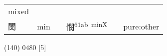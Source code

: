 \documentclass[14pt,a4paper]{scrartcl}
\begin{document}
\begin{longtable}[c]{@{}llllll@{}}
\begin{minipage}[t]{0.14\columnwidth}
mixed
\strut\end{minipage}\tabularnewline
\begin{minipage}[t]{0.14\columnwidth}\raggedright\strut
閔
\strut\end{minipage} &
\begin{minipage}[t]{0.14\columnwidth}\raggedright\strut
min
\strut\end{minipage} &
\begin{minipage}[t]{0.14\columnwidth}\raggedright\strut
\strut\end{minipage} &
\begin{minipage}[t]{0.14\columnwidth}\raggedright\strut
憫\textsuperscript{61ab~minX}
\strut\end{minipage} &
\begin{minipage}[t]{0.14\columnwidth}\raggedright\strut
\strut\end{minipage} &
\begin{minipage}[t]{0.14\columnwidth}\raggedright\strut
pure:other
\strut\end{minipage}\tabularnewline
\bottomrule
\end{longtable}

(140) 0480 {[}5{]}
\end{document}
